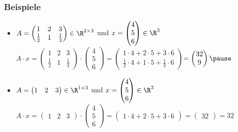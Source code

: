 \begin{frame}\frametitle{Beispiele}
\begin{itemize}
\item $A=\begin{pmatrix} 1 & 2 & 3 \\  \frac{1}{2} & 1 & \frac{1}{3} \end{pmatrix} \in \R^{2\times 3}$ und $x=\begin{pmatrix} 4  \\ 5 \\ 6 \end{pmatrix} \in \R^{3}$\\\pause
$
A\cdot x=\begin{pmatrix} 1 & 2 & 3 \\  \frac{1}{2} & 1 & \frac{1}{3} \end{pmatrix} \cdot \begin{pmatrix} 4  \\ 5 \\ 6 \end{pmatrix}$\pause$=\begin{pmatrix} 1\cdot4 + 2\cdot5 + 3\cdot6 \\  \frac{1}{2}\cdot4 + 1\cdot5 +\frac{1}{3}\cdot6 \end{pmatrix}$\pause$ = \begin{pmatrix} 32 \\ 9 \end{pmatrix}\pause
$
\item $A=\begin{pmatrix} 1 & 2 & 3 \end{pmatrix} \in \R^{1\times 3}$ und $x=\begin{pmatrix} 4  \\ 5 \\ 6 \end{pmatrix} \in \R^{3}$\\\pause
$
A\cdot x=\begin{pmatrix} 1 & 2 & 3  \end{pmatrix} \cdot \begin{pmatrix} 4  \\ 5 \\ 6 \end{pmatrix}$\pause$=\begin{pmatrix} 1\cdot4 + 2\cdot5 + 3\cdot6 \end{pmatrix}$\pause$ = \begin{pmatrix} 32 \end{pmatrix} = 32
$
\end{itemize}
\end{frame}
